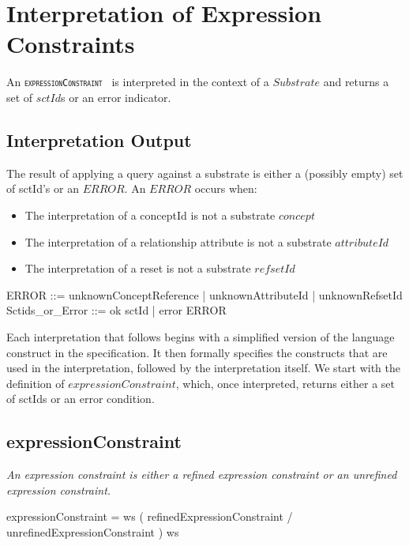 \documentclass{article}
\def\spec#1{{\tt \small \textsc{{#1}} }}
\def\bnf#1{{\scriptsize {{#1}} }}
\def\desc#1{{\small \textsl{{#1}} }}
\begin{document}
\pagebreak
\section{Interpretation of Expression Constraints}
An \spec{expressionConstraint} is interpreted in the context of a $Substrate$ and returns a set of $sctId$s or an error indicator.  

  
\subsection{Interpretation Output}
The result of applying a query against a substrate is either a (possibly empty) set of sctId's or an $ERROR$.  An $ERROR$ occurs when:
\begin{itemize}[noitemsep,nolistsep]
\item The interpretation of a conceptId is not a substrate $concept$
\item The interpretation of a relationship attribute is not a substrate $attributeId$
\item The interpretation of a reset is not a substrate $refsetId$
\end{itemize}


\begin{zed}  
ERROR ::= unknownConceptReference | unknownAttributeId | unknownRefsetId 
\also
Sctids\_or\_Error ::= ok \ldata \power sctId \rdata | error \ldata ERROR \rdata 
\end{zed}

Each interpretation that follows begins with a simplified version
of the language construct in the specification.  It then formally specifies the constructs that are used in the interpretation, followed by the interpretation itself. We start with the definition 
of $expressionConstraint$, which, once interpreted, returns either a set of sctIds or an error condition.
\subsection{expressionConstraint}

\begin{framed}
\desc{An expression constraint is either a refined expression constraint or an unrefined expression constraint.}
\end{framed}
\begin{framed}
\noindent
\bnf{expressionConstraint = ws ( refinedExpressionConstraint / unrefinedExpressionConstraint ) ws}
\end{framed}
\end{document}
